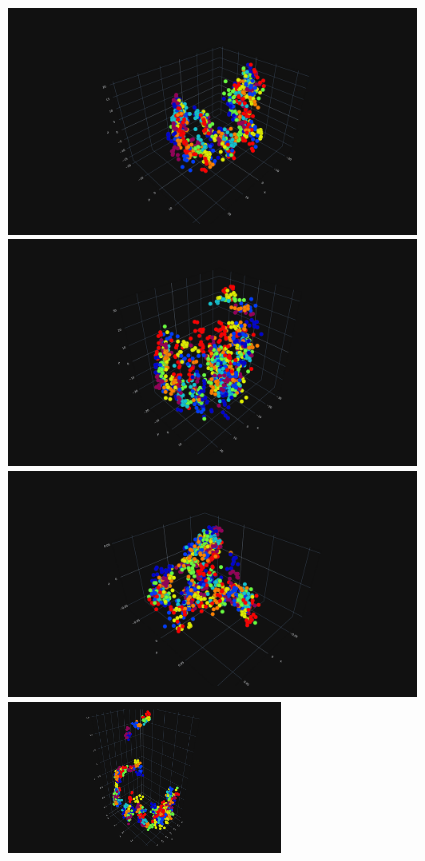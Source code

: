 \documentclass[10pt, twocolumn, letterpaper]{article}
\begin{document}
\begin{figure}
     \includegraphics[width=.33\linewidth, height=6cm,  valign=c]{images/pca_3d.png}
    \includegraphics[width=.33\linewidth, height=6cm,  valign=c]{images/mds_3d.png}
    \includegraphics[width=.33\linewidth, height=6cm,  valign=c]{images/ica_3d.png}
    \\[\smallskipamount]
    \includegraphics[width=.5\linewidth, height=4cm,  valign=c]{images/nnmf_3d.png}

\end{figure}
\end{document}
